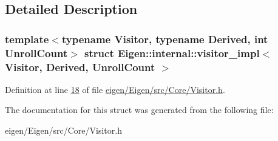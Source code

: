 \subsection{Detailed Description}
\subsubsection*{template$<$typename Visitor, typename Derived, int Unroll\+Count$>$\newline
struct Eigen\+::internal\+::visitor\+\_\+impl$<$ Visitor, Derived, Unroll\+Count $>$}



Definition at line \hyperlink{eigen_2_eigen_2src_2_core_2_visitor_8h_source_l00018}{18} of file \hyperlink{eigen_2_eigen_2src_2_core_2_visitor_8h_source}{eigen/\+Eigen/src/\+Core/\+Visitor.\+h}.



The documentation for this struct was generated from the following file\+:\begin{DoxyCompactItemize}
\item 
eigen/\+Eigen/src/\+Core/\+Visitor.\+h\end{DoxyCompactItemize}

